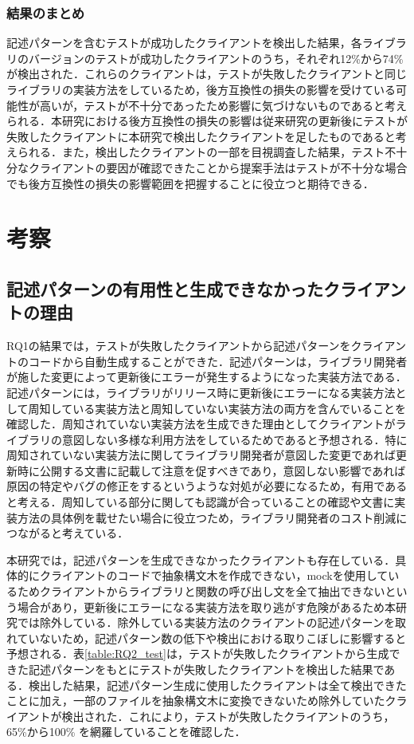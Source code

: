 \documentclass[11pt]{jreport}
\begin{document}
\subsection{結果のまとめ}
記述パターンを含むテストが成功したクライアントを検出した結果，各ライブラリのバージョンのテストが成功したクライアントのうち，それぞれ12\%から74\%が検出された．これらのクライアントは，テストが失敗したクライアントと同じライブラリの実装方法をしているため，後方互換性の損失の影響を受けている可能性が高いが，テストが不十分であったため影響に気づけないものであると考えられる．本研究における後方互換性の損失の影響は従来研究の更新後にテストが失敗したクライアントに本研究で検出したクライアントを足したものであると考えられる．また，検出したクライアントの一部を目視調査した結果，テスト不十分なクライアントの要因が確認できたことから提案手法はテストが不十分な場合でも後方互換性の損失の影響範囲を把握することに役立つと期待できる．


\chapter{考察}\label{sec:discussion}
\section{記述パターンの有用性と生成できなかったクライアントの理由}

RQ1の結果では，テストが失敗したクライアントから記述パターンをクライアントのコードから自動生成することができた．記述パターンは，ライブラリ開発者が施した変更によって更新後にエラーが発生するようになった実装方法である．記述パターンには，ライブラリがリリース時に更新後にエラーになる実装方法として周知している実装方法と周知していない実装方法の両方を含んでいることを確認した．周知されていない実装方法を生成できた理由としてクライアントがライブラリの意図しない多様な利用方法をしているためであると予想される．特に周知されていない実装方法に関してライブラリ開発者が意図した変更であれば更新時に公開する文書に記載して注意を促すべきであり，意図しない影響であれば原因の特定やバグの修正をするというような対処が必要になるため，有用であると考える．周知している部分に関しても認識が合っていることの確認や文書に実装方法の具体例を載せたい場合に役立つため，ライブラリ開発者のコスト削減につながると考えている．

本研究では，記述パターンを生成できなかったクライアントも存在している．具体的にクライアントのコードで抽象構文木を作成できない，mockを使用しているためクライアントからライブラリと関数の呼び出し文を全て抽出できないという場合があり，更新後にエラーになる実装方法を取り逃がす危険があるため本研究では除外している．除外している実装方法のクライアントの記述パターンを取れていないため，記述パターン数の低下や検出における取りこぼしに影響すると予想される．表\ref{table:RQ2_test}は，テストが失敗したクライアントから生成できた記述パターンをもとにテストが失敗したクライアントを検出した結果である．検出した結果，記述パターン生成に使用したクライアントは全て検出できたことに加え，一部のファイルを抽象構文木に変換できないため除外していたクライアントが検出された．これにより，テストが失敗したクライアントのうち，65\%から100\% を網羅していることを確認した．
\end{document}
